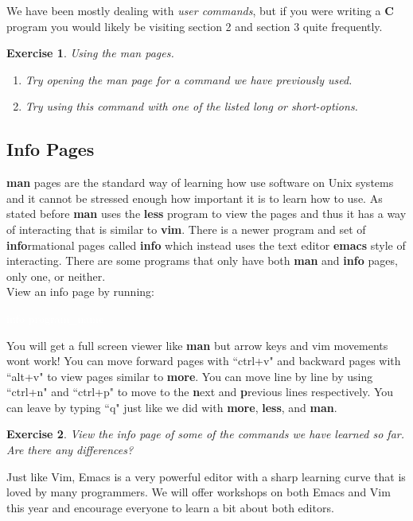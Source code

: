 \documentclass[oneside]{book}
\newcommand{\commandline}[1]{\begin{center} \colorbox{Dark}{\textcolor{white}{#1}} \end{center}}
\newtheorem{ex}{Exercise}[chapter]
\begin{document}
We have been mostly dealing with \textit{user commands}, but if you were writing a \textbf{C} program you would likely be visiting section 2 and section 3 quite frequently.\\

\begin{ex} Using the man pages.
    \begin{enumerate}
        \item Try opening the man page for a command we have previously used.
        \item Try using this command with one of the listed long or short-options. 
    \end{enumerate}
\end{ex}


\subsection{Info Pages}
\textbf{man} pages are the standard way of learning how use software on Unix systems and it cannot be stressed enough how important it is to learn how to use. As stated before \textbf{man} uses the \textbf{less} program to view the pages and thus it has a way of interacting that is similar to \textbf{vim}. There is a newer program and set of \textbf{info}rmational pages called \textbf{info} which instead uses the text editor \textbf{emacs} style of interacting. There are some programs that only have both \textbf{man} and \textbf{info} pages, only one, or neither. \\
View an info page by running:
\commandline{info program\_name}
You will get a full screen viewer like \textbf{man} but arrow keys and vim movements wont work! You can move forward pages with ``ctrl+v" and backward pages with ``alt+v" to view pages similar to \textbf{more}. You can move line by line by using ``ctrl+n" and ``ctrl+p" to move to the \textbf{n}ext and \textbf{p}revious lines respectively. You can leave by typing ``q" just like we did with \textbf{more}, \textbf{less}, and \textbf{man}. \\
\begin{ex}
	View the info page of some of the commands we have learned so far. Are there any differences? 
\end{ex}
Just like Vim, Emacs is a very powerful editor with a sharp learning curve that is loved by many programmers. We will offer workshops on both Emacs and Vim this year and encourage everyone to learn a bit about both editors. 
\end{document}
